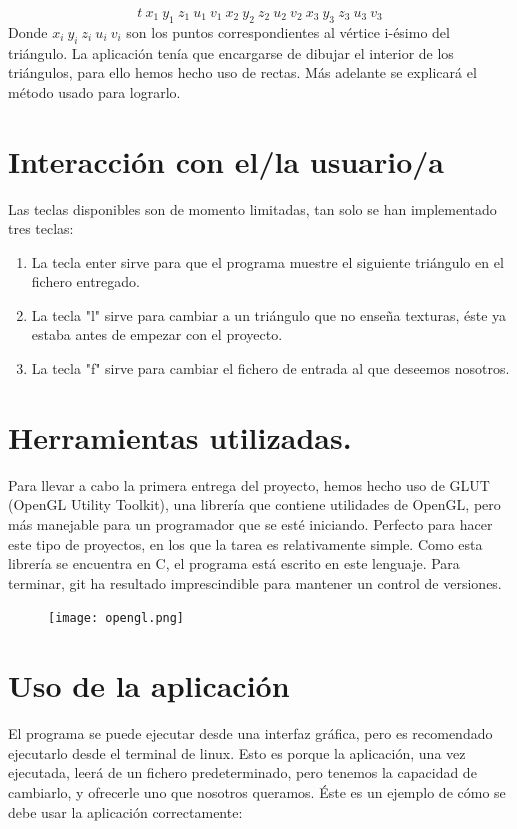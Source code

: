 \documentclass[12pt,a4paper]{article}
\begin{document}
$$
t\ x_1\  y_1\ z_1\ u_1\ v_1\ x_2\ y_2\ z_2\ u_2\ v_2\ x_3\ y_3\ z_3\ u_3\ v_3
$$
Donde $x_i\ y_i\ z_i\ u_i\ v_i$ son los puntos correspondientes al vértice i-ésimo del triángulo. La aplicación tenía que encargarse de dibujar el interior de los triángulos, para ello hemos hecho uso de rectas. Más adelante se explicará el método usado para lograrlo. 
\section{Interacción con el/la usuario/a}
Las teclas disponibles son de momento limitadas, tan solo se han implementado tres teclas:
\begin{enumerate}
	\item La tecla enter sirve para que el programa muestre el siguiente triángulo en el fichero entregado.
	\item La tecla "l" sirve para cambiar a un triángulo que no enseña texturas, éste ya estaba antes de empezar con el proyecto.
	\item La tecla "f" sirve para cambiar el fichero de entrada al que deseemos nosotros.
\end{enumerate}
\section{Herramientas utilizadas.}
Para llevar a cabo la primera entrega del proyecto, hemos hecho uso de GLUT (OpenGL Utility Toolkit), una librería que contiene utilidades de OpenGL, pero más manejable para un programador que se esté iniciando. Perfecto para hacer este tipo de proyectos, en los que la tarea es relativamente simple. Como esta librería se encuentra en C, el programa está escrito en este lenguaje. Para terminar, git ha resultado imprescindible para mantener un control de versiones.
\begin{figure}[H]
	\centering
\texttt{[image: opengl.png]}
\end{figure}
\section{Uso de la aplicación}
El programa se puede ejecutar desde una interfaz gráfica, pero es recomendado ejecutarlo desde el terminal de linux. Esto es porque la aplicación, una vez ejecutada, leerá de un fichero predeterminado, pero tenemos la capacidad de cambiarlo, y ofrecerle uno que nosotros queramos. Éste es un ejemplo de cómo se debe usar la aplicación correctamente:
\end{document}
